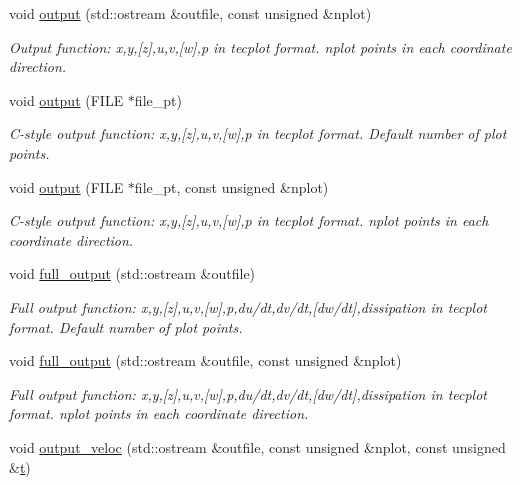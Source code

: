 \begin{DoxyCompactItemize}
void \hyperlink{classoomph_1_1NavierStokesEquations_a2bc96a264dad4175d1aca7946db5f303}{output} (std\+::ostream \&outfile, const unsigned \&nplot)
\begin{DoxyCompactList}\small\item\em Output function\+: x,y,\mbox{[}z\mbox{]},u,v,\mbox{[}w\mbox{]},p in tecplot format. nplot points in each coordinate direction. \end{DoxyCompactList}\item 
void \hyperlink{classoomph_1_1NavierStokesEquations_acb921a406e5825d9b17ed41c40317e4a}{output} (F\+I\+LE $\ast$file\+\_\+pt)
\begin{DoxyCompactList}\small\item\em C-\/style output function\+: x,y,\mbox{[}z\mbox{]},u,v,\mbox{[}w\mbox{]},p in tecplot format. Default number of plot points. \end{DoxyCompactList}\item 
void \hyperlink{classoomph_1_1NavierStokesEquations_af09ce1e73bca9a9ac93cb2e34de24f6b}{output} (F\+I\+LE $\ast$file\+\_\+pt, const unsigned \&nplot)
\begin{DoxyCompactList}\small\item\em C-\/style output function\+: x,y,\mbox{[}z\mbox{]},u,v,\mbox{[}w\mbox{]},p in tecplot format. nplot points in each coordinate direction. \end{DoxyCompactList}\item 
void \hyperlink{classoomph_1_1NavierStokesEquations_aacb9de301ecd9ba0247e05be645955f3}{full\+\_\+output} (std\+::ostream \&outfile)
\begin{DoxyCompactList}\small\item\em Full output function\+: x,y,\mbox{[}z\mbox{]},u,v,\mbox{[}w\mbox{]},p,du/dt,dv/dt,\mbox{[}dw/dt\mbox{]},dissipation in tecplot format. Default number of plot points. \end{DoxyCompactList}\item 
void \hyperlink{classoomph_1_1NavierStokesEquations_a6ef3acb397f096ebf34826e05dcb225b}{full\+\_\+output} (std\+::ostream \&outfile, const unsigned \&nplot)
\begin{DoxyCompactList}\small\item\em Full output function\+: x,y,\mbox{[}z\mbox{]},u,v,\mbox{[}w\mbox{]},p,du/dt,dv/dt,\mbox{[}dw/dt\mbox{]},dissipation in tecplot format. nplot points in each coordinate direction. \end{DoxyCompactList}\item 
void \hyperlink{classoomph_1_1NavierStokesEquations_ab2eccb3a38f6d342002028708449cc53}{output\+\_\+veloc} (std\+::ostream \&outfile, const unsigned \&nplot, const unsigned \&\hyperlink{cfortran_8h_af6f0bd3dc13317f895c91323c25c2b8f}{t})

\end{DoxyCompactItemize}

